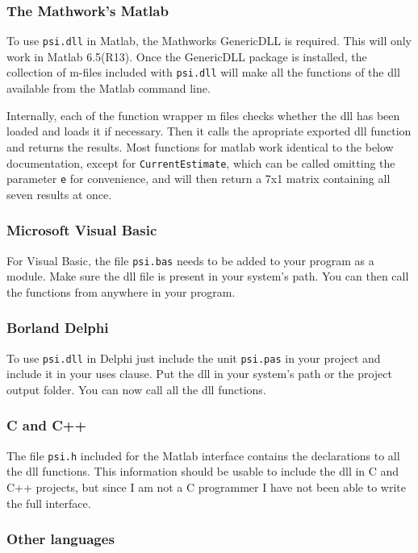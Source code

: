 \documentclass[10pt,letterpaper]{article}
\begin{document}
\subsubsection{The Mathwork's Matlab}

To use {\tt psi.dll} in Matlab, the Mathworks GenericDLL is required. This
will only work in Matlab 6.5(R13). Once the GenericDLL package is installed,
the collection of m-files included with {\tt psi.dll} will make all the functions
of the dll available from the Matlab command line.

Internally, each of the function wrapper m files checks whether the dll has been 
loaded and loads it if necessary. Then it calls the apropriate exported dll 
function and returns the results. Most functions for matlab work identical to 
the below documentation, except for {\tt CurrentEstimate}, which can be called 
omitting the parameter {\tt e} for convenience, and will then return a 7x1 
matrix containing all seven results at once.

\subsubsection{Microsoft Visual Basic}

For Visual Basic, the file {\tt psi.bas} needs to be added to your program as a 
module. Make sure the dll file is present in your system's path. You can then 
call the functions from anywhere in your program.


\subsubsection{Borland Delphi}

To use {\tt psi.dll} in Delphi just include the unit {\tt psi.pas} in your 
project and include it in your uses clause. Put the dll in your system's path or 
the project output folder. You can now call all the dll functions.

\subsubsection{C and C++}

The file {\tt psi.h} included for the Matlab interface contains the declarations 
to all the dll functions. This information should be usable to include the dll 
in C and C++ projects, but since I am not a C programmer I have not been able to 
write the full interface.

\subsubsection{Other languages}
\end{document}

